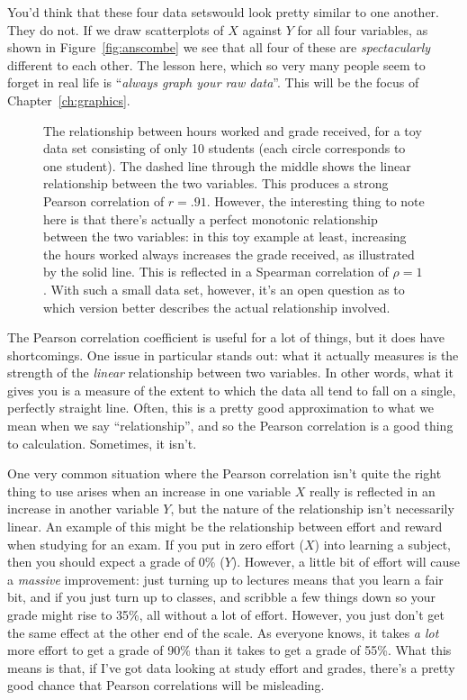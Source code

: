 You'd think that these four data setswould look pretty similar to one another. They do not. If we draw scatterplots of $X$ against $Y$ for all four variables, as shown in Figure~\ref{fig:anscombe} we see that all four of these are {\it spectacularly} different to each other. The lesson here, which so very many people seem to forget in real life is ``{\it always graph your raw data}''. This will be the focus of Chapter~\ref{ch:graphics}.


\begin{figure}[t]
\begin{center}
\end{center}
\caption{The relationship between hours worked and grade received, for a toy data set consisting of only 10 students (each circle corresponds to one student). The dashed line through the middle shows the linear relationship between the two variables. This produces a strong Pearson correlation of $r = .91$. However, the interesting thing to note here is that there's actually a perfect monotonic relationship between the two variables: in this toy example at least, increasing the hours worked always increases the grade received, as illustrated by the solid line. This is reflected in a Spearman correlation of $\rho = 1$. With such a small data set, however, it's an open question as to which version better describes the actual relationship involved. }
\HR
\label{fig:rankcorrpic}
\end{figure}

The Pearson correlation coefficient is useful for a lot of things, but it does have shortcomings. One issue in particular stands out: what it actually measures is the strength of the {\it linear} relationship between two variables. In other words, what it gives you is a measure of the extent to which the data all tend to fall on a single, perfectly straight line. Often, this is a pretty good approximation to what we mean when we say ``relationship'', and so the Pearson correlation is a good thing to calculation. Sometimes, it isn't. 

One very common situation where the Pearson correlation isn't quite the right thing to use arises when an increase in one variable $X$ really is reflected in an increase in another variable $Y$, but the nature of the relationship isn't necessarily linear. An example of this might be the relationship between effort and reward when studying for an exam. If you put in zero effort ($X$) into learning a subject, then you should expect a grade of 0\% ($Y$). However, a little bit of effort will cause a {\it massive} improvement: just turning up to lectures means that you learn a fair bit, and if you just turn up to classes, and scribble a few things down so your grade might rise to 35\%, all without a lot of effort. However, you just don't get the same effect at the other end of the scale. As everyone knows, it takes {\it a lot} more effort to get a grade of 90\% than it takes to get a grade of 55\%. What this means is that, if I've got data looking at study effort and grades, there's a pretty good chance that Pearson correlations will be misleading. 


